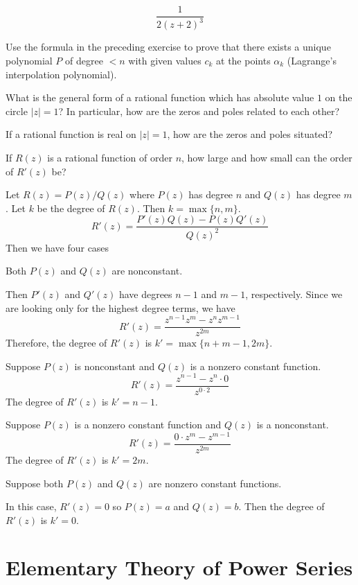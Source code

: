 \begin{exercise}
\[  \frac{1}{2(z + 2)^3}
  \]
\item
  Use the formula in the preceding exercise to prove that there exists a
  unique polynomial \(P\) of degree \(< n\) with given values \(c_k\) at the
  points \(\alpha_k\) (Lagrange's interpolation polynomial).
\item
  What is the general form of a rational function which has absolute value
  \(1\) on the circle \(\lvert z\rvert = 1\)?
  In particular, how are the zeros and poles related to each other?
\item
  If a rational function is real on \(\lvert z\rvert = 1\), how are the zeros
  and poles situated?
\item
  If \(R(z)\) is a rational function of order \(n\), how large and how small
  can the order of \(R'(z)\) be?
  \par\smallskip
  Let \(R(z) = P(z)/Q(z)\) where \(P(z)\) has degree \(n\) and \(Q(z)\) has
  degree \(m\).
  Let \(k\) be the degree of \(R(z)\).
  Then \(k = \max\{n,m\}\).
  \[
  R'(z) = \frac{P'(z)Q(z) - P(z)Q'(z)}{Q(z)^2}
  \]
  Then we have four cases
  \begin{exercise}[label = (\alph*)]
  \item
    Both \(P(z)\) and \(Q(z)\) are nonconstant.
    \par\smallskip
    Then \(P'(z)\) and \(Q'(z)\) have degrees \(n - 1\) and \(m - 1\),
    respectively.
    Since we are looking only for the highest degree terms, we have
    \[
    R'(z) = \frac{z^{n - 1}z^m - z^nz^{m - 1}}{z^{2m}}
    \]
    Therefore, the degree of \(R'(z)\) is \(k' = \max\{n + m - 1, 2m\}\).
  \item
    Suppose \(P(z)\) is nonconstant and \(Q(z)\) is a nonzero constant
    function.
    \[
    R'(z) = \frac{z^{n - 1} - z^n\cdot 0}{z^{0\cdot 2}}
    \]
    The degree of \(R'(z)\) is \(k' = n - 1\).
  \item
    Suppose \(P(z)\) is a nonzero constant function and \(Q(z)\) is a
    nonconstant.
    \[
    R'(z) = \frac{0\cdot z^m - z^{m - 1}}{z^{2m}}
    \]
    The degree of \(R'(z)\) is \(k' = 2m\).
  \item
    Suppose both \(P(z)\) and \(Q(z)\) are nonzero constant functions.
    \par\smallskip
    In this case, \(R'(z) = 0\) so \(P(z) = a\) and \(Q(z) = b\).
    Then the degree of \(R'(z)\) is \(k' = 0\).
  \end{exercise}
\end{exercise}

\section{Elementary Theory of Power Series}

